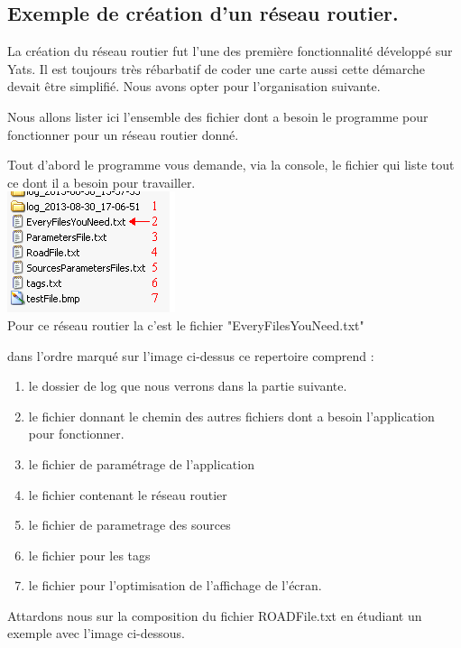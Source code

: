 \documentclass[a4paper,11pt]{article}
\begin{document}
\subsection{Exemple de création d'un réseau routier.}

La création du réseau routier fut l'une des première fonctionnalité développé sur Yats. Il est toujours très rébarbatif de coder une carte aussi cette démarche devait être simplifié. Nous avons opter pour l'organisation suivante.

Nous allons lister ici l'ensemble des fichier dont a besoin le programme pour fonctionner pour un réseau routier donné.

Tout d'abord le programme vous demande, via la console, le fichier qui liste tout ce dont il a besoin pour travailler.\\

\includegraphics[scale=0.8]{imgDiverses/fileList.png}\\

Pour ce réseau routier la c'est le fichier "EveryFilesYouNeed.txt" 

dans l'ordre marqué sur l'image ci-dessus ce repertoire comprend : 
\begin{enumerate}
\item le dossier de log que nous verrons dans la partie suivante.
\item le fichier donnant le chemin des autres fichiers dont a besoin l'application pour fonctionner.
\item le fichier de paramétrage de l'application
\item le fichier contenant le réseau routier
\item le fichier de parametrage des sources
\item le fichier pour les tags
\item le fichier pour l'optimisation de l'affichage de l'écran.
\end{enumerate}

Attardons nous sur la composition du fichier ROADFile.txt en étudiant un exemple avec l'image ci-dessous.\\
\end{document}
